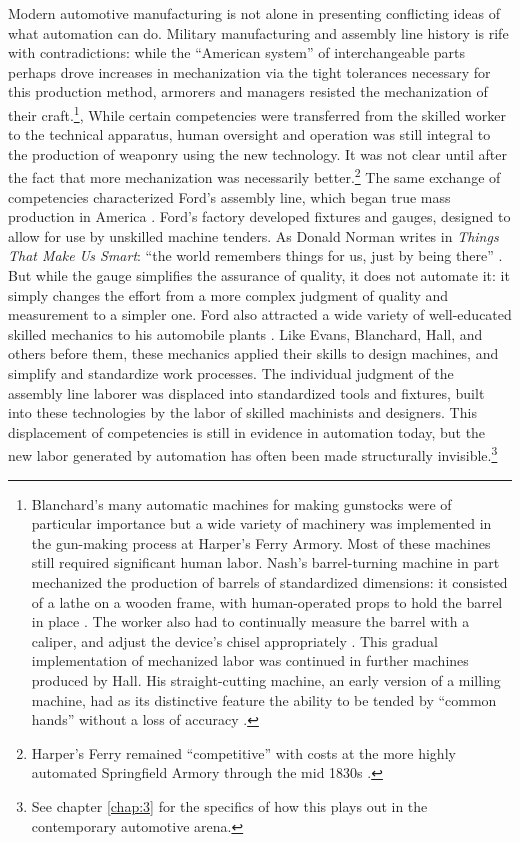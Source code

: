 Modern automotive manufacturing is not alone in presenting conflicting ideas
of what automation can do. Military manufacturing and assembly line
history is rife with contradictions: while the ``American system'' of interchangeable
parts perhaps drove increases in mechanization via the tight
tolerances necessary for this production 
method, armorers and managers resisted the
mechanization of their craft.\footnote{Blanchard's many automatic
  machines for making gunstocks were of particular
  importance \cite[p. 56]{roesmithHarpers} but a wide variety of machinery
  was implemented in the gun-making process at Harper's Ferry Armory. Most of
 these machines still required significant human labor. Nash's
 barrel-turning machine in part mechanized the production of barrels
 of standardized dimensions: it consisted of a lathe on a wooden
 frame, with human-operated props to hold the barrel in
 place \cite[p. 119]{roesmithHarpers}. The worker also had to continually
 measure the barrel with a caliper, and adjust the device's chisel
 appropriately \cite[p. 121]{roesmithHarpers}. This gradual implementation of
 mechanized labor was continued in further machines produced by Hall.
 His straight-cutting machine, an early version of a milling machine,
 had as its distinctive feature the ability to be tended by ``common
 hands'' without a loss of
accuracy \cite[p. 239]{roesmithHarpers}.}, While certain competencies were
transferred from the skilled worker
to the technical apparatus, human oversight and operation was still
integral to the production of weaponry using the new technology. It was
not clear until after the fact that more mechanization was necessarily
better.\footnote{Harper's Ferry remained ``competitive'' with
costs at the more highly automated Springfield Armory through the mid
1830s \cite[p. 324]{roesmithHarpers}.} The same exchange of
competencies characterized Ford's assembly line, which began
true mass production in America \cite[p. 217]{hounshell}. Ford's factory developed fixtures
and gauges, designed to allow for use by unskilled machine tenders. As Donald
Norman writes in \emph{Things That Make Us Smart}: ``the world remembers things for us, just by being
there'' \cite[p. 147]{normanThings}. But while the gauge simplifies the
assurance  of quality, it does not
automate it:  it simply changes the effort from a more complex judgment
of quality and measurement to a simpler one. Ford also attracted a wide variety of well-educated skilled mechanics
to his automobile plants \cite[p. 223]{hounshell}. Like Evans, Blanchard, Hall, and others
before them, these mechanics applied their skills to design machines,
and simplify and standardize work processes. The individual judgment
of the assembly line laborer was displaced into standardized tools and
fixtures, built into these technologies by the labor of skilled
machinists and designers. This displacement of competencies is still in
evidence in automation today, but the new labor generated by automation
has often
been made structurally invisible.\footnote{See chapter \ref{chap:3}
  for the specifics of how this plays out in the contemporary automotive arena.}

